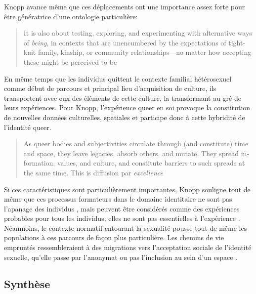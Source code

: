 Knopp avance même que ces déplacements ont une importance assez forte pour être génératrice d'une ontologie particulière:
\foreignblockquote{english}[{\cite[123]{Knopp2004}}][.]{It is also about testing, exploring, and experimenting with alternative ways of \emph{being}, in contexts that are unencumbered by the expectations of tight-knit family, kinship, or community relationships—no matter how accepting these might be perceived to be}
En même temps que les individus \lgbt{} quittent le contexte familial hétérosexuel comme début de parcours et principal lieu d'acquisition de culture, ils transportent avec eux des éléments de cette culture, la transformant au gré de leurs expériences.
Pour Knopp, l'expérience queer en soi provoque la constitution de nouvelles données culturelles, spatiales et participe donc à cette hybridité de l'identité queer.
\foreignblockquote{english}[{\cite[130]{Knopp2004}}][.]{As queer bodies and subjectivities circulate through (and constitute) time and space, they leave legacies, absorb others, and mutate. They spread information, values, and culture, and constitute barriers to such spreads at the same time. This is diffusion par \emph{excellence}}

Si ces caractéristiques sont particulièrement importantes, Knopp souligne tout de même que ces processus formateurs dans le domaine identitaire ne sont pas l'apanage des individus \lgbt{}, mais peuvent être considérés comme des expériences probables pour tous les individus; elles ne sont pas essentielles à l'expérience \lgbt{}.
Néanmoins, le contexte normatif entourant la sexualité pousse tout de même les populations \lgbt{} à ces parcours de façon plus particulière.
Les chemins de vie empruntés ressembleraient à des migrations vers l'acceptation sociale de l'identité sexuelle, qu'elle passe par l'anonymat ou pas l'inclusion au sein d'un espace \lgbt{}.

\subsection{Synthèse}
\label{sub:synth_se}

